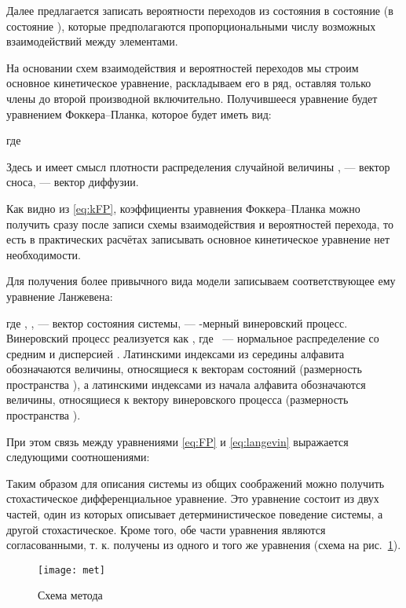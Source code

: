 \documentclass[floatfix,
showkeys,
twocolumn, nofootinbib, superscriptaddress, ]{revtex4-1}
\begin{document}
  Далее предлагается записать вероятности переходов из состояния
   в состояние  (в
  состояние ), которые
  предполагаются пропорциональными числу возможных взаимодействий
  между элементами.




  На основании схем взаимодействия и вероятностей переходов мы строим
  основное кинетическое уравнение, раскладываем его в ряд, оставляя
  только члены до второй производной включительно. Получившееся
  уравнение будет уравнением Фоккера--Планка, которое будет иметь вид:



  где


  Здесь  и имеет смысл плотности распределения
  случайной величины ,  --- вектор сноса,  ---
  вектор диффузии.

  Как видно из \eqref{eq:kFP}, коэффициенты уравнения Фоккера--Планка
  можно получить сразу после записи схемы взаимодействия и
  вероятностей перехода, то есть в практических расчётах записывать
  основное кинетическое уравнение нет необходимости.

  Для получения более привычного вида модели записываем
  соответствующее ему уравнение Ланжевена:

  где , ,
   --- вектор состояния системы,  --- -мерный винеровский процесс. Винеровский
  процесс реализуется как , где
  ~--- нормальное распределение со средним
   и дисперсией . Латинскими индексами из середины алфавита
  обозначаются величины, относящиеся к векторам состояний (размерность
  пространства ), а латинскими индексами из начала алфавита
  обозначаются величины, относящиеся к вектору винеровского процесса
  (размерность пространства ).

  При этом связь между уравнениями \eqref{eq:FP} и \eqref{eq:langevin}
  выражается следующими соотношениями:




  Таким образом для описания системы из общих соображений можно
  получить стохастическое дифференциальное уравнение. Это уравнение
  состоит из двух частей, один из которых описывает детерминистическое
  поведение системы, а другой стохастическое. Кроме того, обе части
  уравнения являются согласованными, т. к. получены из одного и того
  же уравнения (схема на рис.~\ref{fig:met}).

\begin{figure}\centering
  \texttt{[image: met]}
  \caption{Схема метода}
\label{fig:met}
\end{figure}
\end{document}
